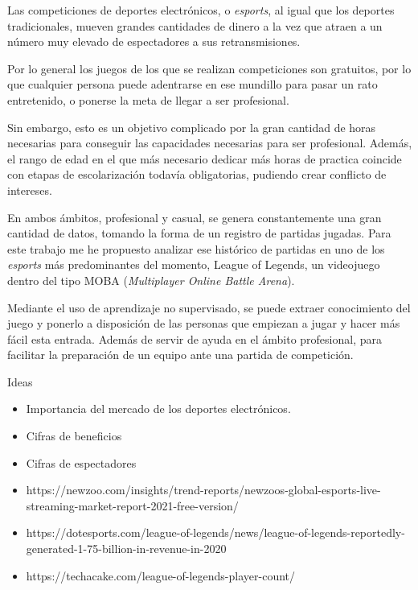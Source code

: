 
Las competiciones de deportes electrónicos, o \textit{esports}, al igual que los deportes tradicionales, mueven grandes cantidades de dinero a la vez que atraen a un número muy elevado de espectadores a sus retransmisiones.

Por lo general los juegos de los que se realizan competiciones son gratuitos, por lo que cualquier persona puede adentrarse en ese mundillo para pasar un rato entretenido, o ponerse la meta de llegar a ser profesional.

Sin embargo, esto es un objetivo complicado por la gran cantidad de horas necesarias para conseguir las capacidades necesarias para ser profesional. Además, el rango de edad en el que más necesario dedicar más horas de practica coincide con etapas de escolarización todavía obligatorias, pudiendo crear conflicto de intereses.

En ambos ámbitos, profesional y casual, se genera constantemente una gran cantidad de datos, tomando la forma de un registro de partidas jugadas. Para este trabajo me he propuesto analizar ese histórico de partidas en uno de los \textit{esports} más predominantes del momento, League of Legends, un videojuego dentro del tipo MOBA (\textit{Multiplayer Online Battle Arena}).

Mediante el uso de aprendizaje no supervisado, se puede extraer conocimiento del juego y ponerlo a disposición de las personas que empiezan a jugar y hacer más fácil esta entrada. Además de servir de ayuda en el ámbito profesional, para facilitar la preparación de un equipo ante una partida de competición.

\hfill
Ideas 
\begin{itemize}
    \item Importancia del mercado de los deportes electrónicos.
    \item Cifras de beneficios
    \item Cifras de espectadores
    \item https://newzoo.com/insights/trend-reports/newzoos-global-esports-live-streaming-market-report-2021-free-version/
    \item https://dotesports.com/league-of-legends/news/league-of-legends-reportedly-generated-1-75-billion-in-revenue-in-2020
    \item https://techacake.com/league-of-legends-player-count/
\end{itemize}